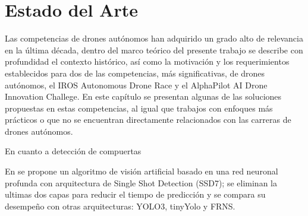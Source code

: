 \chapter{Estado del Arte}

Las competencias de drones autónomos han adquirido un grado alto de relevancia en la última década, dentro del marco teórico del presente trabajo se describe con profundidad el contexto histórico, así como la motivación y los requerimientos establecidos para dos de las competencias, más significativas, de drones autónomos, el  IROS Autonomous Drone Race y el AlphaPilot AI Drone Innovation Challege. 
En este capítulo se presentan algunas de las soluciones propuestas en estas competencias, al igual que trabajos con enfoques más prácticos o que no se encuentran directamente relacionados con las carreras de drones autónomos.

En cuanto a detección de compuertas

En \cite{cabrera2019gate} se propone un algoritmo de visión artificial basado en una red neuronal profunda con arquitectura de Single Shot Detection (SSD7); se eliminan la ultimas dos capas para reducir el tiempo de predicción y se compara su desempeño con otras arquitecturas: YOLO3, tinyYolo y FRNS.